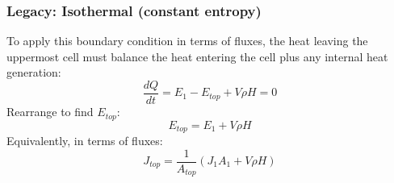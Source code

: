 \subsubsection{Legacy: Isothermal (constant entropy)}
To apply this boundary condition in terms of fluxes, the heat leaving the uppermost cell must balance the heat entering the cell plus any internal heat generation:
\begin{equation}
\frac{dQ}{dt} = E_{1} - E_{top} + V \rho H = 0
\end{equation}
Rearrange to find $E_{top}$:
\begin{equation}
E_{top} = E_1 + V \rho H
\end{equation}
Equivalently, in terms of fluxes:
\begin{equation}
J_{top} = \frac{1}{A_{top}} \left( J_1A_1 + V \rho H \right)
\end{equation}
